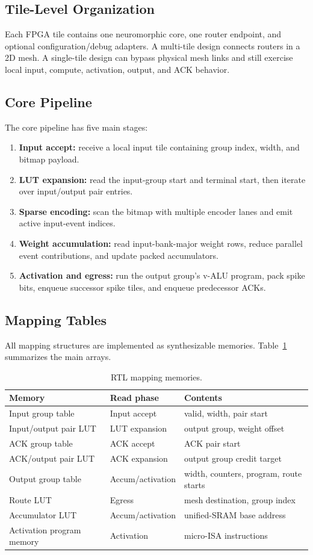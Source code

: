 \documentclass[10pt,conference]{IEEEtran}
\begin{document}
\subsection{Tile-Level Organization}
Each FPGA tile contains one neuromorphic core, one router endpoint, and optional configuration/debug adapters. A multi-tile design connects routers in a 2D mesh. A single-tile design can bypass physical mesh links and still exercise local input, compute, activation, output, and ACK behavior.

\subsection{Core Pipeline}
The core pipeline has five main stages:
\begin{enumerate}
    \item \textbf{Input accept:} receive a local input tile containing group index, width, and bitmap payload.
    \item \textbf{LUT expansion:} read the input-group start and terminal start, then iterate over input/output pair entries.
    \item \textbf{Sparse encoding:} scan the bitmap with multiple encoder lanes and emit active input-event indices.
    \item \textbf{Weight accumulation:} read input-bank-major weight rows, reduce parallel event contributions, and update packed accumulators.
    \item \textbf{Activation and egress:} run the output group's v-ALU program, pack spike bits, enqueue successor spike tiles, and enqueue predecessor ACKs.
\end{enumerate}

\subsection{Mapping Tables}
All mapping structures are implemented as synthesizable memories. Table~\ref{tab:tables} summarizes the main arrays.

\begin{table}[t]
\centering
\caption{RTL mapping memories.}
\label{tab:tables}
\begin{tabular}{lll}
\toprule
Memory & Read phase & Contents \\
\midrule
Input group table & Input accept & valid, width, pair start \\
Input/output pair LUT & LUT expansion & output group, weight offset \\
ACK group table & ACK accept & ACK pair start \\
ACK/output pair LUT & ACK expansion & output group credit target \\
Output group table & Accum/activation & width, counters, program, route starts \\
Route LUT & Egress & mesh destination, group index \\
Accumulator LUT & Accum/activation & unified-SRAM base address \\
Activation program memory & Activation & micro-ISA instructions \\
\bottomrule
\end{tabular}
\end{table}
\end{document}
